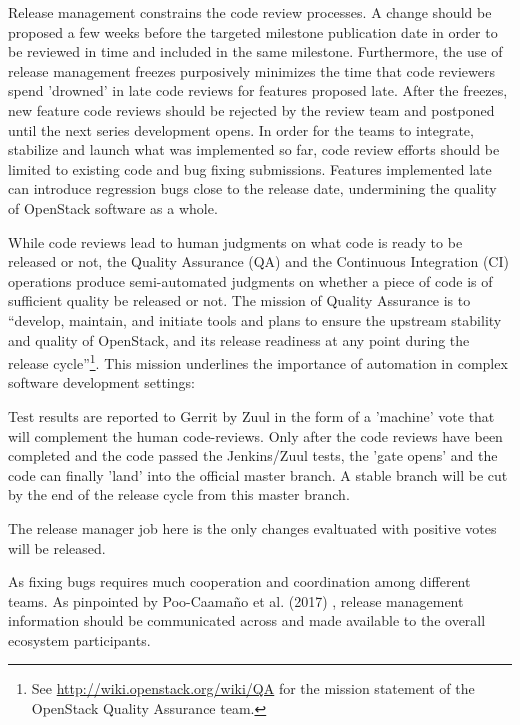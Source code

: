 \documentclass[dvipsnames]{interact}
\theoremstyle{plain}\newtheorem{theorem}{Theorem}[section]
\theoremstyle{definition}
\theoremstyle{remark}
\newenvironment{newStuff}{
    \begin{color}{Sepia}
    \begin{tabular}{|p{1.0\textwidth}|}
    \hline\\
    }
    { 
    \\\\\hline
    \end{tabular} 
    \end{color}
    }
\renewenvironment{newStuff}{}{}
\begin{document}
\begin{newStuff}



Release management constrains the code review processes.  A change should be proposed a few weeks before the targeted milestone publication date in order to be reviewed in time and included in the same milestone. Furthermore, the use of release management freezes purposively minimizes the time that code reviewers spend 'drowned' in late code reviews for features proposed late. After the freezes, new feature code reviews should be rejected by the review team and postponed until the next series development opens. In order for the teams to integrate, stabilize and launch what was implemented so far, code review efforts should be limited to existing code and bug fixing submissions. Features implemented late can introduce regression bugs close to the release date, undermining the quality of OpenStack software as a whole. 


While code reviews lead to human judgments on what code is ready to be released or not, the Quality Assurance (QA) and the Continuous Integration (CI) operations produce semi-automated judgments on whether a piece of code is of sufficient quality be released or not.  The mission of Quality Assurance is to ``develop, maintain, and initiate tools and plans to ensure the upstream stability and quality of OpenStack, and its release readiness at any point during the release cycle''\footnote{See \url{http://wiki.openstack.org/wiki/QA} for the mission statement of the OpenStack Quality Assurance team.}. This mission underlines the importance of automation in complex software development settings:


Test results are reported to Gerrit by Zuul in the form of a 'machine' vote that will complement the human code-reviews. Only after the code reviews have been completed and the code passed the Jenkins/Zuul tests, the 'gate opens' and the code can finally 'land' into the official master branch. A stable branch will be cut by the end of the release cycle from this master branch.  

 The release manager job here is the only changes evaltuated with positive votes will be released. 


As fixing bugs requires much cooperation and coordination among different teams.  As pinpointed by Poo-Caama{\~{n}}o et al. (2017)  \citep{PooCaamanoKnauss_et_al2017}, release management information should be communicated across and made available to the overall ecosystem participants. 


\end{newStuff}
\end{document}
